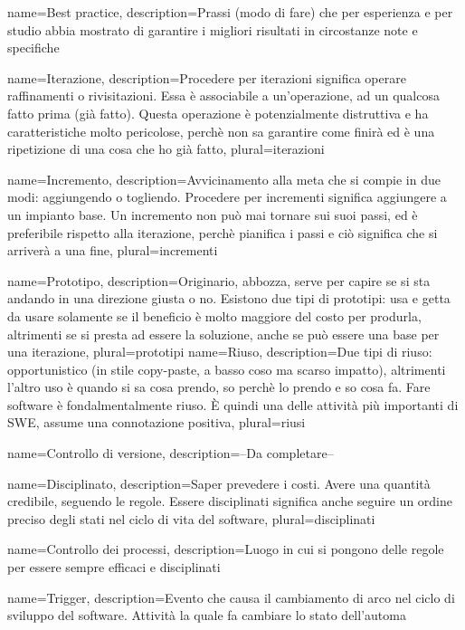 {
name=Best practice,
description={Prassi (modo di fare) che per esperienza e per studio abbia mostrato di garantire i migliori risultati in circostanze note e specifiche}
}

{
name=Iterazione,
description={Procedere per iterazioni significa operare raffinamenti o rivisitazioni. Essa è associabile a un'operazione, ad un qualcosa fatto prima (già fatto). Questa operazione è potenzialmente distruttiva e ha caratteristiche molto pericolose, perchè non sa garantire come finirà ed è una ripetizione di una cosa che ho già fatto},
plural=iterazioni
}

{
name=Incremento,
description={Avvicinamento alla meta che si compie in due modi: aggiungendo o togliendo. Procedere per incrementi significa aggiungere a un impianto base. Un incremento non può mai tornare sui suoi passi, ed è preferibile rispetto alla iterazione, perchè pianifica i passi e ciò significa che si arriverà a una fine},
plural=incrementi
}

{
name=Prototipo,
description={Originario, abbozza, serve per capire se si sta andando in una direzione giusta o no. Esistono due tipi di prototipi: usa e getta da usare solamente se il beneficio è molto maggiore del costo per produrla, altrimenti se si presta ad essere la soluzione, anche se può essere una base per una iterazione},
plural=prototipi
}
{
name=Riuso,
description={Due tipi di riuso: opportunistico (in stile copy-paste, a basso coso ma scarso impatto), altrimenti l'altro uso è quando si sa cosa prendo, so perchè lo prendo e so cosa fa. Fare software è fondalmentalmente riuso. \`E quindi una delle attività più importanti di SWE, assume una connotazione positiva},
plural=riusi
}

{
name=Controllo di versione,
description={--Da completare--}
}

{
name=Disciplinato,
description={Saper prevedere i costi. Avere una quantità credibile, seguendo le regole. Essere disciplinati significa anche seguire un ordine preciso degli stati nel ciclo di vita del software},
plural=disciplinati
}

{
name=Controllo dei processi,
description={Luogo in cui si pongono delle regole per essere sempre efficaci e disciplinati}
}

{
name=Trigger,
description={Evento che causa il cambiamento di arco nel ciclo di sviluppo del software. Attività la quale fa cambiare lo stato dell'automa}
}

